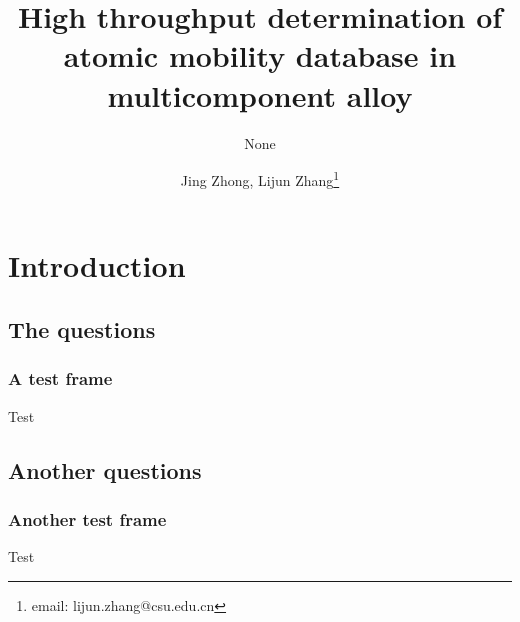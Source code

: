 \documentclass[xcolor=dvipsnames]{beamer}
\institute{State Key Laboratory of Powder Metallurgy, Central South University}
\title{High throughput determination of atomic mobility database in multicomponent alloy}
\subtitle{None}
\author{Jing Zhong, Lijun Zhang\thanks{email: lijun.zhang@csu.edu.cn}}
\begin{document}
{
\begin{frame}
\titlepage
\end{frame}

\section{Introduction}
\subsection{The questions}
\begin{frame}\frametitle{A test frame}Test\end{frame}
\subsection{Another questions}
\begin{frame}\frametitle{Another test frame}Test\end{frame}


}
\end{document}

